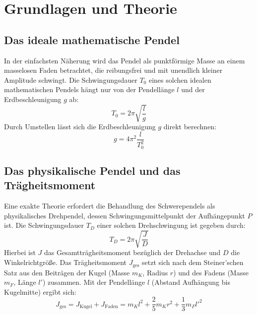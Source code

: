 \documentclass[12pt,a4paper,titlepage]{scrartcl}
\numberwithin{equation}{section}
\numberwithin{table}{section}
\numberwithin{figure}{section}
\begin{document}
\section{Grundlagen und Theorie}\label{sec:Grundlagen}


\subsection{Das ideale mathematische Pendel}
In der einfachsten Näherung wird das Pendel als punktförmige Masse an einem masselosen Faden betrachtet, die reibungsfrei und mit unendlich kleiner Amplitude schwingt. Die Schwingungsdauer $T_0$ eines solchen idealen mathematischen Pendels hängt nur von der Pendellänge $l$ und der Erdbeschleunigung $g$ ab:
\begin{equation}
    T_0 = 2\pi \sqrt{\frac{l}{g}}
    \label{eq:T0}
\end{equation}
Durch Umstellen lässt sich die Erdbeschleunigung $g$ direkt berechnen:
\begin{equation}
    g = 4\pi^2 \frac{l}{T_0^2}
    \label{eq:g_ideal}
\end{equation}

\subsection{Das physikalische Pendel und das Trägheitsmoment}
Eine exakte Theorie erfordert die Behandlung des Schwerependels als physikalisches Drehpendel, dessen Schwingungsmittelpunkt der Aufhängepunkt $P$ ist. Die Schwingungsdauer $T_D$ einer solchen Drehschwingung ist gegeben durch:
\begin{equation}
    T_D = 2\pi \sqrt{\frac{J}{D}}
    \label{eq:TD}
\end{equation}
Hierbei ist $J$ das Gesamtträgheitsmoment bezüglich der Drehachse und $D$ die Winkelrichtgröße. Das Trägheitsmoment $J_{\text{ges}}$ setzt sich nach dem Steiner'schen Satz aus den Beiträgen der Kugel (Masse $m_K$, Radius $r$) und des Fadens (Masse $m_F$, Länge $l'$) zusammen. Mit der Pendellänge $l$ (Abstand Aufhängung bis Kugelmitte) ergibt sich:
\begin{equation}
    J_{\text{ges}} = J_{\text{Kugel}} + J_{\text{Faden}} = m_K l^2 + \frac{2}{5}m_K r^2 + \frac{1}{3}m_F l'^2
    \label{eq:J_ges}
\end{equation}
\end{document}
